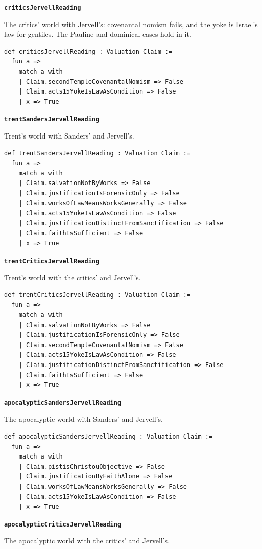 \documentclass[11pt]{article}
\begin{document}
\par\medskip\noindent\textbf{\texttt{critics\allowbreak{}Jervell\allowbreak{}Reading}}\par\nobreak\noindent
The critics' world with Jervell's: covenantal nomism fails, and the yoke is Israel's law for gentiles. The Pauline and dominical cases hold in it.

{\small\begin{verbatim}
def criticsJervellReading : Valuation Claim :=
  fun a =>
    match a with
    | Claim.secondTempleCovenantalNomism => False
    | Claim.acts15YokeIsLawAsCondition => False
    | x => True
\end{verbatim}}
\par\medskip\noindent\textbf{\texttt{trent\allowbreak{}Sanders\allowbreak{}Jervell\allowbreak{}Reading}}\par\nobreak\noindent
Trent's world with Sanders' and Jervell's.

{\small\begin{verbatim}
def trentSandersJervellReading : Valuation Claim :=
  fun a =>
    match a with
    | Claim.salvationNotByWorks => False
    | Claim.justificationIsForensicOnly => False
    | Claim.worksOfLawMeansWorksGenerally => False
    | Claim.acts15YokeIsLawAsCondition => False
    | Claim.justificationDistinctFromSanctification => False
    | Claim.faithIsSufficient => False
    | x => True
\end{verbatim}}
\par\medskip\noindent\textbf{\texttt{trent\allowbreak{}Critics\allowbreak{}Jervell\allowbreak{}Reading}}\par\nobreak\noindent
Trent's world with the critics' and Jervell's.

{\small\begin{verbatim}
def trentCriticsJervellReading : Valuation Claim :=
  fun a =>
    match a with
    | Claim.salvationNotByWorks => False
    | Claim.justificationIsForensicOnly => False
    | Claim.secondTempleCovenantalNomism => False
    | Claim.acts15YokeIsLawAsCondition => False
    | Claim.justificationDistinctFromSanctification => False
    | Claim.faithIsSufficient => False
    | x => True
\end{verbatim}}
\par\medskip\noindent\textbf{\texttt{apocalyptic\allowbreak{}Sanders\allowbreak{}Jervell\allowbreak{}Reading}}\par\nobreak\noindent
The apocalyptic world with Sanders' and Jervell's.

{\small\begin{verbatim}
def apocalypticSandersJervellReading : Valuation Claim :=
  fun a =>
    match a with
    | Claim.pistisChristouObjective => False
    | Claim.justificationByFaithAlone => False
    | Claim.worksOfLawMeansWorksGenerally => False
    | Claim.acts15YokeIsLawAsCondition => False
    | x => True
\end{verbatim}}
\par\medskip\noindent\textbf{\texttt{apocalyptic\allowbreak{}Critics\allowbreak{}Jervell\allowbreak{}Reading}}\par\nobreak\noindent
The apocalyptic world with the critics' and Jervell's.
\end{document}
